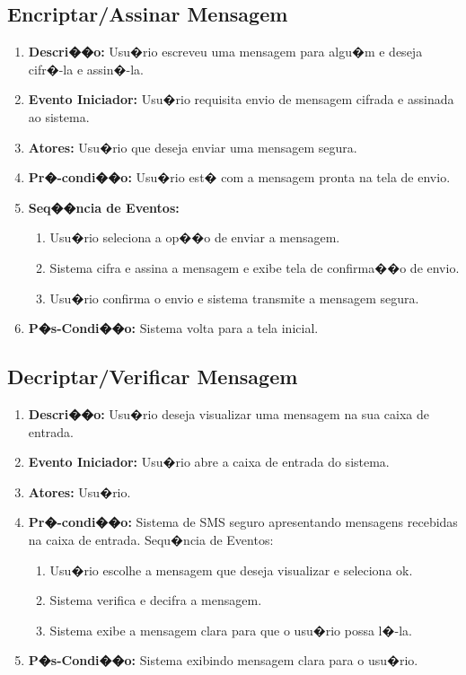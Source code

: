 \documentclass[a4paper,capchap,espacoduplo,normaltoc]{abntepusp}
\begin{document}
\subsection{Encriptar/Assinar Mensagem}
		\begin{enumerate}
		\item \textbf{Descri��o:} Usu�rio escreveu uma mensagem para algu�m e deseja cifr�-la e assin�-la.
		\item \textbf{Evento Iniciador:} Usu�rio requisita envio de mensagem cifrada e assinada ao sistema.
		\item \textbf{Atores:} Usu�rio que deseja enviar uma mensagem segura.
		\item \textbf{Pr�-condi��o:} Usu�rio est� com a mensagem pronta na tela de envio.
		\item \textbf{Seq��ncia de Eventos:}
		\begin{enumerate}
		\item	Usu�rio seleciona a op��o de enviar a mensagem.
		\item	Sistema cifra e assina a mensagem e exibe tela de confirma��o de envio.
		\item	Usu�rio confirma o envio e sistema transmite a mensagem segura.
		\end{enumerate}
		\item \textbf{P�s-Condi��o:} Sistema volta para a tela inicial.
		\end{enumerate}

\subsection{Decriptar/Verificar Mensagem}
  	\begin{enumerate}
  	\item \textbf{Descri��o:} Usu�rio deseja visualizar uma mensagem na sua caixa de entrada.
		\item \textbf{Evento Iniciador:} Usu�rio abre a caixa de entrada do sistema.
		\item \textbf{Atores:} Usu�rio.
		\item \textbf{Pr�-condi��o:} Sistema de SMS seguro apresentando mensagens recebidas na caixa de entrada.
		Sequ�ncia de Eventos: 
		\begin{enumerate}
		\item	Usu�rio escolhe a mensagem que deseja visualizar e seleciona ok.
		\item	Sistema verifica e decifra a mensagem.
		\item	Sistema exibe a mensagem clara para que o usu�rio possa l�-la.
		\end{enumerate}
		\item \textbf{P�s-Condi��o:} Sistema exibindo mensagem clara para o usu�rio.
		\end{enumerate}
\end{document}
